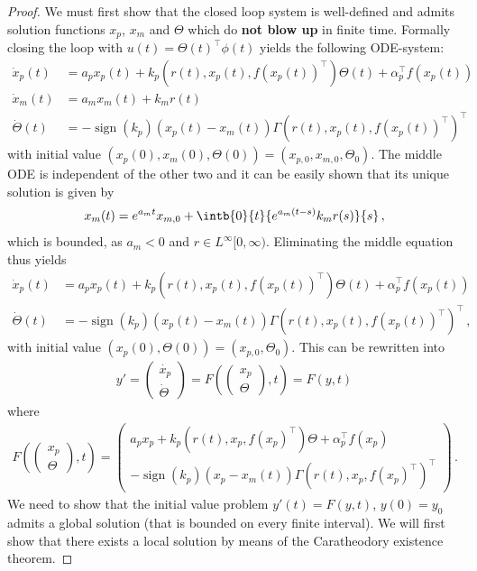 \documentclass[12pt,a4paper]{article}
\DeclareMathOperator{\sign}{sign}
\newcommand{\mat}[1]{\left(\begin{matrix}#1\end{matrix}\right)}
\begin{document}
	\begin{proof}
		We must first show that the closed loop system is well-defined and admits solution functions $x_p$, $x_m$ and $\Theta$ which do \textbf{not blow up} in finite time.
		Formally closing the loop with $u(t) = \Theta(t)^\top \phi(t)$ yields the following ODE-system:
		\begin{align*}
			\dot{x}_p(t) &= a_p x_p(t) + k_p (r(t), x_p(t), f(x_p(t))^\top) \Theta(t)  + \alpha_p^\top f(x_p(t)) \\
			\dot{x}_m(t) &= a_m x_m(t) + k_m r(t) \\
			\dot{\Theta}(t) &= -\sign(k_p) (x_p(t)-x_m(t)) \Gamma (r(t), x_p(t), f(x_p(t))^\top)^\top
		\end{align*}
		with initial value $(x_p(0),x_m(0),\Theta(0)) = (x_{p,0},x_{m,0},\Theta_0)$.
		The middle ODE is independent of the other two and it can be easily shown that its unique solution is given by 
		\begin{align*}
			x_m(t) = e^{a_m t} x_{m,0} + \intb{0}{t}{e^{a_m(t-s)}k_m r(s)}{s}\,,
		\end{align*}
		which is bounded, as $a_m < 0$ and $r \in L^\infty[0,\infty)$.
		Eliminating the middle equation thus yields
		\begin{align*}
				\dot{x}_p(t) &= a_p x_p(t) + k_p (r(t), x_p(t), f(x_p(t))^\top) \Theta(t)  + \alpha_p^\top f(x_p(t)) \\
				\dot{\Theta}(t) &= -\sign(k_p) (x_p(t)-x_m(t)) \Gamma (r(t), x_p(t), f(x_p(t))^\top)^\top\,,
		\end{align*}
		with initial value $(x_p(0),\Theta(0)) = (x_{p,0},\Theta_0)$.
		This can be rewritten into 
		\begin{align*}
			 y' = \mat{\dot{x_p}\\ \dot{\Theta}} = F\left(\mat{x_p\\ \Theta},t\right) = F(y,t)
		\end{align*}
		where 
		\begin{align*}
			F\left(\mat{x_p \\ \Theta},t\right)
			= \mat{a_px_p + k_p (r(t), x_p, f(x_p)^\top) \Theta  + \alpha_p^\top f(x_p) \\ -\sign(k_p) (x_p-x_m(t)) \Gamma (r(t), x_p, f(x_p)^\top)^\top}\,.
		\end{align*}
		We need to show that the initial value problem $y'(t) = F(y,t)$, $y(0) = y_0$ admits a global solution (that is bounded on every finite interval).
		We will first show that there exists a local solution by means of the Caratheodory existence theorem.

\end{proof}
\end{document}
